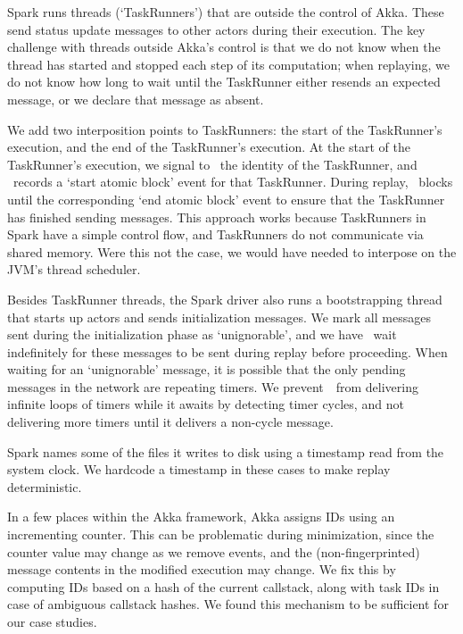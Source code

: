 Spark runs threads (`TaskRunners') that are outside the control of
Akka. These send status
update messages to other actors during their execution.
The key challenge with threads outside Akka's control is that we do not know
when the thread has started and stopped each step of its computation;
when replaying, we do not know how long to wait until the TaskRunner either resends
an expected message, or we declare that message as absent.

We add two interposition points to TaskRunners:
the start of the
TaskRunner's execution, and the end of the TaskRunner's execution.
At the start of the TaskRunner's execution, we signal to \sys~the identity of the TaskRunner,
and \sys~records a `start atomic block' event for that TaskRunner. During
replay, \sys~blocks until the corresponding `end atomic block' event to ensure
that the TaskRunner has finished sending messages. This approach
works because TaskRunners in
Spark have a simple control flow, and TaskRunners do not communicate via shared memory. Were this
not the case, we would have needed to interpose on the JVM's thread scheduler.


Besides
TaskRunner threads, the Spark driver also runs a bootstrapping thread
that starts up actors
and sends initialization messages. We mark all
messages sent during the initialization phase as `unignorable', and we have
\sys~wait indefinitely for these messages to be sent during
replay before proceeding. When waiting for an `unignorable'
message, it is possible that the only pending messages in the network are
repeating timers. We
prevent~\sys~from delivering infinite loops of timers while it awaits
by detecting timer cycles, and not delivering more timers until it delivers
a non-cycle message.

Spark names some of the files it writes to disk using a timestamp read from the system clock.
We hardcode a timestamp in these cases to make replay deterministic.

 In a few places within the Akka framework, Akka assigns IDs using an
incrementing counter. This can be problematic during minimization, since the counter value
may change as we remove events, and the (non-fingerprinted) message contents in the modified execution may change.
We fix this by computing IDs based on a hash
of the current callstack, along with task IDs in case of ambiguous callstack
hashes. We found this mechanism to be sufficient for our case studies.

